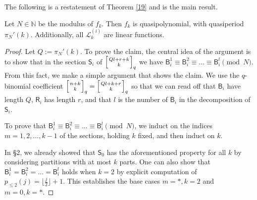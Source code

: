 \documentclass[12pt]{article}
\newcommand{\floor}[1]{{\lfloor{#1}\rfloor}}
\newcommand{\N}{\mathbb{N}}
\newcommand{\qbinom}[2]{\left[{#1 \atop #2}\right]_q}
\newcommand{\eqdef}{:=}
\begin{document}
The following is a restatement of Theorem \ref{19} and is the main result. 
\begin{theorem}
Let $N\in \N$ be the modulus of $f_{k}$. Then $f_{k}$ is quasipolynomial, with quasiperiod $\pi_{N}'(k)$. Additionally, all $\mathcal{L}_{k}^{(i)}$ are linear functions. \label{main} \end{theorem} \begin{proof}

Let $Q \eqdef \pi_{N}'(k)$. To prove the claim, the central idea of the argument is to show that in the section $\mathsf{S}_i$ of $\qbinom{Ql+r+k}{k}$ we have $\mathsf{B}_i^1\equiv \mathsf{B}_i^2\equiv \ldots \equiv \mathsf{B}_i^l \pmod{N}$. From this fact, we make a simple argument that shows the claim. We use the $q$-binomial coefficient $\qbinom{n+k}{k}=\qbinom{Ql+k+r}{k}$ so that we can read off that $\mathsf{B}_i$ have length $Q$,  $\mathsf{R}_i$ has length $r$, and that $l$ is the number of $\mathsf{B}_i$ in the decomposition of $\mathsf{S}_i$.

To prove that $\mathsf{B}_i^1\equiv \mathsf{B}_i^2\equiv \ldots \equiv \mathsf{B}_i^l \pmod{N}$, we induct on the indices $m=1, 2, \ldots, k-1$ of the sections, holding $k$ fixed, and then induct on $k$.

In \S 2, we already showed that $\mathsf{S}_0$ has the aforementioned property for all $k$ by considering partitions with at most $k$ parts. One can also show that $\mathsf{B}_i^1=\mathsf{B}_i^2=\ldots = \mathsf{B}_i^l$ holds when $k=2$ by explicit computation of $p_{\le 2}(j)=\floor{\frac{j}{2}}+1.$ This establishes the base cases $m=*, k=2$ and $m=0, k=*$. 


\end{proof}
\end{document}
